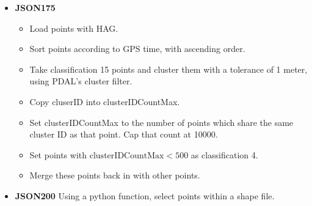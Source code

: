 \documentclass[a4paper,11pt,twoside]{article}
\theoremstyle{definition}
\theoremstyle{remark}
\begin{document}
\begin{itemize}
\begin{itemize}
\begin{itemize}
\item Find points with clusterIDCountMax $<1000$, and reclassify them as classification 4.
\item Merge the classification 15, 6 and 4 back together.) 
\end{itemize}
\item \textbf{14} Merge the result of 13 and 4: The new classification 15, 6, 4 and 13, back together.
\item \textbf{15} Take points with classification 6 (building) and 13 (vegetation), and use the virus tool to with 
\begin{center}
\begin{verbatim}
{\"itter\":\"1\",\"class\":\"6\",\"clip\":\"2.00\"}"
\end{verbatim}
\end{center}
to spread classification 6 points over a 2 meter clip. Repeat this step three times.
\item Merge classification 4, 6, 13 and 15.
\item \textbf{16} Merge the result of \textbf{03} and \textbf{15}.
\item\textbf{17}Among the points with classification 6 or 14, use the virus tool with 
\begin{center}
\begin{verbatim}
"{\"itter\":\"1\",\"class\":\"6\",\"clip\":\"0.5\"}"
\end{verbatim}
\end{center}
Repeat this process. 
\item \textbf{18} Merge the results of \textbf{16} and \textbf{01}.
\end{itemize}
\item \textbf{JSON175}\begin{itemize}
\item Load points with HAG.
\item Sort points according to GPS time, with ascending order.
\item Take classification 15 points and cluster them with a tolerance of 1 meter, using PDAL's cluster filter.
\item Copy cluserID into clusterIDCountMax.
\item Set clusterIDCountMax to the number of points which share the same cluster ID as that point. Cap that count at 10000.
\item Set points with $\mathrm{clusterIDCountMax}<500$ as classification 4.
\item Merge these points back in with other points.
\end{itemize}
\item \textbf{JSON200} Using a python function, select points within a shape file.
\end{itemize}
\end{document}

